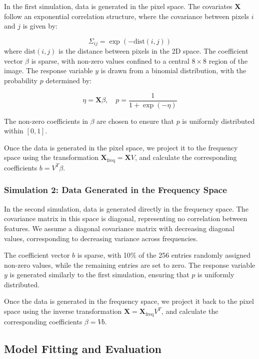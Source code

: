 \documentclass[12pt]{article}
\begin{document}
In the first simulation, data is generated in the pixel space. The covariates \( \mathbf{X} \) follow an exponential correlation structure, where the covariance between pixels \( i \) and \( j \) is given by:

\[
\Sigma_{i j} = \exp(-\text{dist}(i, j))
\]
where \( \text{dist}(i, j) \) is the distance between pixels in the 2D space. The coefficient vector \( \beta \) is sparse, with non-zero values confined to a central \( 8 \times 8 \) region of the image. The response variable \( y \) is drawn from a binomial distribution, with the probability \( p \) determined by:

\[
\eta = \mathbf{X} \beta, \quad p = \frac{1}{1 + \exp(-\eta)}
\]

The non-zero coefficients in \( \beta \) are chosen to ensure that \( p \) is uniformly distributed within \( [0, 1] \).

Once the data is generated in the pixel space, we project it to the frequency space using the transformation \( \mathbf{X}_{\text{freq}} = \mathbf{X} V \), and calculate the corresponding coefficients \( b = V^T \beta \).

\subsubsection*{Simulation 2: Data Generated in the Frequency Space}

In the second simulation, data is generated directly in the frequency space. The covariance matrix in this space is diagonal, representing no correlation between features. We assume a diagonal covariance matrix with decreasing diagonal values, corresponding to decreasing variance across frequencies.

The coefficient vector \( b \) is sparse, with 10\% of the 256 entries randomly assigned non-zero values, while the remaining entries are set to zero. The response variable \( y \) is generated similarly to the first simulation, ensuring that \( p \) is uniformly distributed.

Once the data is generated in the frequency space, we project it back to the pixel space using the inverse transformation \( \mathbf{X} = \mathbf{X}_{\text{freq}} V^T \), and calculate the corresponding coefficients \( \beta = V b \).

\subsection*{Model Fitting and Evaluation}
\end{document}
